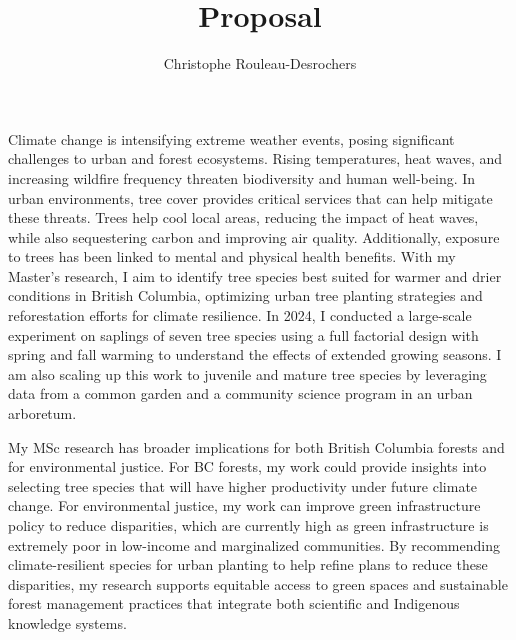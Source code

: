 \documentclass[11pt,letter]{article}
\title{Proposal}
\author{Christophe Rouleau-Desrochers}
\begin{document}

\maketitle

Climate change is intensifying extreme weather events, posing significant challenges to urban and forest ecosystems. Rising temperatures, heat waves, and increasing wildfire frequency threaten biodiversity and human well-being. In urban environments, tree cover provides critical services that can help mitigate these threats. Trees help cool local areas, reducing the impact of heat waves, while also sequestering carbon and improving air quality. Additionally, exposure to trees has been linked to mental and physical health benefits. With my Master's research, I aim to identify tree species best suited for warmer and drier conditions in British Columbia, optimizing urban tree planting strategies and reforestation efforts for climate resilience.
In 2024, I conducted a large-scale experiment on saplings of seven tree species using a full factorial design with spring and fall warming to understand the effects of extended growing seasons. I am also scaling up this work to juvenile and mature tree species by leveraging data from a common garden and a community science program in an urban arboretum. 

My MSc research has broader implications for both British Columbia forests and for environmental justice. For BC forests, my work could provide insights into selecting tree species that will have higher productivity under future climate change. For environmental justice, my work can improve green infrastructure policy to reduce disparities, which are currently high as green infrastructure is extremely poor in low-income and marginalized communities. By recommending climate-resilient species for urban planting to help refine plans to reduce these disparities, my research supports equitable access to green spaces and sustainable forest management practices that integrate both scientific and Indigenous knowledge systems. %
\end{document}
